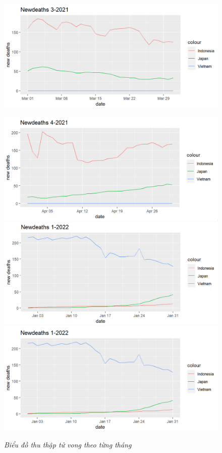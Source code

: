 \documentclass[a4paper]{article}
\theoremstyle{definition}
\begin{document}
\begin{enumerate}[1)]
\begin{figure}[H]
\begin{center}
		    \includegraphics[scale=0.5]{vi/nd_3_2021}
	    \end{center}
	\end{figure}

	
	\begin{figure}[H]
	    \begin{center}
    		\includegraphics[scale=0.5]{vi/nd_4_2021}
    		\includegraphics[scale=0.5]{vi/nd_5_2021}
    		\includegraphics[scale=0.5]{vi/nd_1_2022}
	    \end{center}
	   \vspace{+3mm}\caption{\it Biểu đồ thu thập tử vong theo từng tháng}
	   \end{figure}
	   

\end{enumerate}
\end{document}
